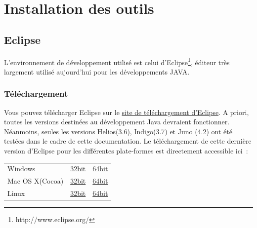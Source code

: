 % 
\chapter{Installation des outils}

\section{Eclipse}

L'environnement de développement utilisé est celui d'Eclipse\footnote{http://www.eclipse.org/}, éditeur très largement utilisé aujourd'hui pour les développements JAVA.

\medskip

\subsection{Téléchargement}
Vous pouvez télécharger Eclipse sur le 
\href{http://www.eclipse.org/downloads/}{site de téléchargement d'Eclipse}. A priori, toutes les versions destinées au développement Java devraient fonctionner. Néanmoins, seules les versions Helios(3.6), Indigo(3.7) et Juno (4.2) ont été testées dans le cadre de cette documentation. Le téléchargement de cette dernière version d'Eclipse pour les différentes plate-formes est directement accessible ici~:\\

\begin{center}
\begin{tabular}[!t]{lll}
Windows&
\href{http://www.eclipse.org/downloads/download.php?file=/technology/epp/downloads/release/juno/SR1/eclipse-jee-juno-SR1-win32.zip}{32bit}&
\href{http://www.eclipse.org/downloads/download.php?file=/technology/epp/downloads/release/juno/SR1/eclipse-jee-juno-SR1-win32-x86_64.zip}{64bit}\\
Mac OS X(Cocoa)&
\href{http://www.eclipse.org/downloads/download.php?file=/technology/epp/downloads/release/juno/SR1/eclipse-jee-juno-SR1-macosx-cocoa.tar.gz}{32bit}&
\href{http://www.eclipse.org/downloads/download.php?file=/technology/epp/downloads/release/juno/SR1/eclipse-jee-juno-SR1-macosx-cocoa-x86_64.tar.gz}{64bit}\\
Linux&
\href{http://www.eclipse.org/downloads/download.php?file=/technology/epp/downloads/release/juno/SR1/eclipse-jee-juno-SR1-linux-gtk.tar.gz}{32bit}&
\href{http://www.eclipse.org/downloads/download.php?file=/technology/epp/downloads/release/juno/SR1/eclipse-jee-juno-SR1-linux-gtk-x86_64.tar.gz}{64bit}\\
\end{tabular}
\end{center}

